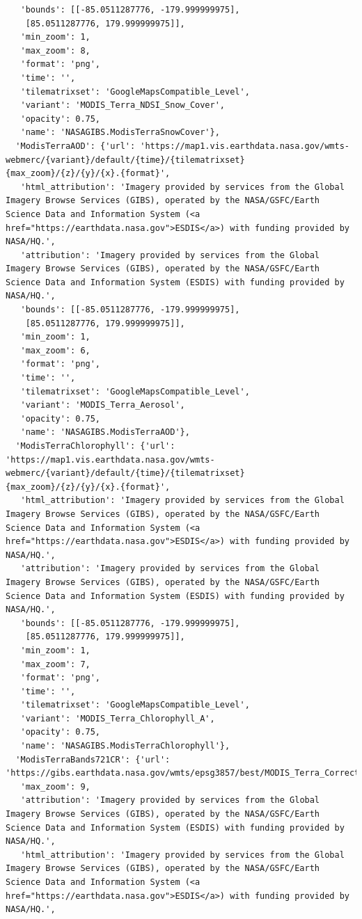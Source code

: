 \documentclass[
  letterpaper,
  DIV=11,
  numbers=noendperiod]{scrreprt}
\begin{document}
\begin{verbatim}
   'bounds': [[-85.0511287776, -179.999999975],
    [85.0511287776, 179.999999975]],
   'min_zoom': 1,
   'max_zoom': 8,
   'format': 'png',
   'time': '',
   'tilematrixset': 'GoogleMapsCompatible_Level',
   'variant': 'MODIS_Terra_NDSI_Snow_Cover',
   'opacity': 0.75,
   'name': 'NASAGIBS.ModisTerraSnowCover'},
  'ModisTerraAOD': {'url': 'https://map1.vis.earthdata.nasa.gov/wmts-webmerc/{variant}/default/{time}/{tilematrixset}{max_zoom}/{z}/{y}/{x}.{format}',
   'html_attribution': 'Imagery provided by services from the Global Imagery Browse Services (GIBS), operated by the NASA/GSFC/Earth Science Data and Information System (<a href="https://earthdata.nasa.gov">ESDIS</a>) with funding provided by NASA/HQ.',
   'attribution': 'Imagery provided by services from the Global Imagery Browse Services (GIBS), operated by the NASA/GSFC/Earth Science Data and Information System (ESDIS) with funding provided by NASA/HQ.',
   'bounds': [[-85.0511287776, -179.999999975],
    [85.0511287776, 179.999999975]],
   'min_zoom': 1,
   'max_zoom': 6,
   'format': 'png',
   'time': '',
   'tilematrixset': 'GoogleMapsCompatible_Level',
   'variant': 'MODIS_Terra_Aerosol',
   'opacity': 0.75,
   'name': 'NASAGIBS.ModisTerraAOD'},
  'ModisTerraChlorophyll': {'url': 'https://map1.vis.earthdata.nasa.gov/wmts-webmerc/{variant}/default/{time}/{tilematrixset}{max_zoom}/{z}/{y}/{x}.{format}',
   'html_attribution': 'Imagery provided by services from the Global Imagery Browse Services (GIBS), operated by the NASA/GSFC/Earth Science Data and Information System (<a href="https://earthdata.nasa.gov">ESDIS</a>) with funding provided by NASA/HQ.',
   'attribution': 'Imagery provided by services from the Global Imagery Browse Services (GIBS), operated by the NASA/GSFC/Earth Science Data and Information System (ESDIS) with funding provided by NASA/HQ.',
   'bounds': [[-85.0511287776, -179.999999975],
    [85.0511287776, 179.999999975]],
   'min_zoom': 1,
   'max_zoom': 7,
   'format': 'png',
   'time': '',
   'tilematrixset': 'GoogleMapsCompatible_Level',
   'variant': 'MODIS_Terra_Chlorophyll_A',
   'opacity': 0.75,
   'name': 'NASAGIBS.ModisTerraChlorophyll'},
  'ModisTerraBands721CR': {'url': 'https://gibs.earthdata.nasa.gov/wmts/epsg3857/best/MODIS_Terra_CorrectedReflectance_Bands721/default/{time}/GoogleMapsCompatible_Level9/{z}/{y}/{x}.jpg',
   'max_zoom': 9,
   'attribution': 'Imagery provided by services from the Global Imagery Browse Services (GIBS), operated by the NASA/GSFC/Earth Science Data and Information System (ESDIS) with funding provided by NASA/HQ.',
   'html_attribution': 'Imagery provided by services from the Global Imagery Browse Services (GIBS), operated by the NASA/GSFC/Earth Science Data and Information System (<a href="https://earthdata.nasa.gov">ESDIS</a>) with funding provided by NASA/HQ.',

\end{verbatim}
\end{document}
